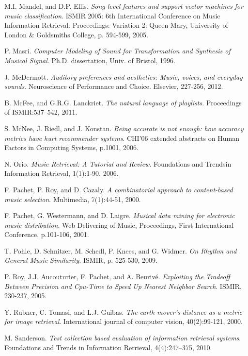 \documentclass[11pt, oneside, openright]{Thesis} %
\begin{document}
\begin{thebibliography}{99}
M.I. Mandel, and D.P. Ellis.
\textit{Song-level features and support vector machines for music classification}.
ISMIR 2005: 6th International Conference on Music Information Retrieval: Proceedings: Variation 2: Queen Mary, University of London & Goldsmiths College, p. 594-599, 2005.

P. Masri.
\textit{Computer Modeling of Sound for Transformation and Synthesis of Musical Signal}.
Ph.D. dissertation, Univ. of Bristol, 1996.

J. McDermott.
\textit{Auditory preferences and aesthetics: Music, voices, and everyday sounds}.
Neuroscience of Performance and Choice. Elsevier, 227-256, 2012.

B. McFee, and G.R.G. Lanckriet. 
\textit{The natural language of playlists}.
Proceedings of ISMIR:537–542, 2011.

S. McNee, J. Riedl, and J. Konstan.
\textit{Being accurate is not enough: how accuracy metrics have hurt recommender systems}.
CHI'06 extended abstracts on Human Factors in Computing Systems, p.1001, 2006.

N. Orio.
\textit{Music Retrieval: A Tutorial and Review}. 
Foundations and Trends\textregistered in Information Retrieval, 1(1):1-90, 2006.

F. Pachet, P. Roy, and D. Cazaly.
\textit{A combinatorial approach to content-based music selection}.
Multimedia, 7(1):44-51, 2000.

F. Pachet, G. Westermann, and D. Laigre.
\textit{Musical data mining for electronic music distribution}.
Web Delivering of Music, Proceedings, First International Conference, p.101-106, 2001.

T. Pohle, D. Schnitzer, M. Schedl, P. Knees, and G. Widmer.
\textit{On Rhythm and General Music Similarity}.
ISMIR, p. 525-530, 2009.

P. Roy, J.J. Aucouturier, F. Pachet, and A. Beurivé.
\textit{Exploiting the Tradeoff Between Precision and Cpu-Time to Speed Up Nearest Neighbor Search}.
ISMIR, 230-237, 2005.

Y. Rubner, C. Tomasi, and L.J. Guibas.
\textit{The earth mover's distance as a metric for image retrieval}.
International journal of computer vision, 40(2):99-121, 2000.

M. Sanderson. 
\textit{Test collection based evaluation of information retrieval systems}.
Foundations and Trends in Information Retrieval, 4(4):247–375, 2010.


\end{thebibliography}
\end{document}
